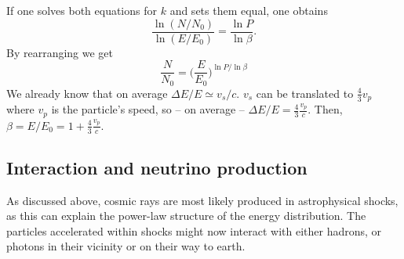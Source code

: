 \documentclass[
    a4paper, %
    fontsize=10pt, %
    twoside=false, %
    numbers=noenddot, %
    fontmethod=tex,
]{kaobook}
\begin{document}
If one solves both equations for $k$ and sets them equal, one obtains
\begin{equation}
    \frac{\ln (N/N_0)}{\ln (E/E_0)} = \frac{\ln P}{\ln \beta}.
\end{equation}
By rearranging we get
\begin{equation}
    \frac{N}{N_0} = \bigg(\frac{E}{E_0}\bigg)^{\ln P / \ln \beta}
\end{equation}
We already know that on average $\Delta E/E \simeq v_s/c$. $v_s$ can be translated to $\frac{4}{3} v_p$ where $v_p$ is the particle's speed, so -- on average -- $\Delta E/E = \frac{4}{3}\frac{v_p}{c}$. Then, $\beta = E/E_0 = 1 + \frac{4}{3}\frac{v_p}{c}$.

\subsection{Interaction and neutrino production}
As discussed above, cosmic rays are most likely produced in astrophysical shocks, as this can explain the power-law structure of the energy distribution. The particles accelerated within shocks might now interact with either hadrons, or photons in their vicinity or on their way to earth.
\end{document}

